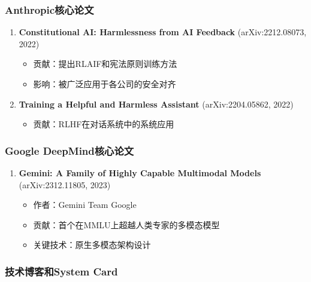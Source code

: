 \documentclass[12pt,a4paper]{article}
\begin{document}
\subsubsection{Anthropic核心论文}

\begin{enumerate}
    \item \textbf{Constitutional AI: Harmlessness from AI Feedback} (arXiv:2212.08073, 2022)
    \begin{itemize}
        \item 贡献：提出RLAIF和宪法原则训练方法
        \item 影响：被广泛应用于各公司的安全对齐
    \end{itemize}
    
    \item \textbf{Training a Helpful and Harmless Assistant} (arXiv:2204.05862, 2022)
    \begin{itemize}
        \item 贡献：RLHF在对话系统中的系统应用
    \end{itemize}
\end{enumerate}

\subsubsection{Google DeepMind核心论文}

\begin{enumerate}
    \item \textbf{Gemini: A Family of Highly Capable Multimodal Models} (arXiv:2312.11805, 2023)
    \begin{itemize}
        \item 作者：Gemini Team Google
        \item 贡献：首个在MMLU上超越人类专家的多模态模型
        \item 关键技术：原生多模态架构设计
    \end{itemize}
\end{enumerate}

\subsubsection{技术博客和System Card}
\end{document}
